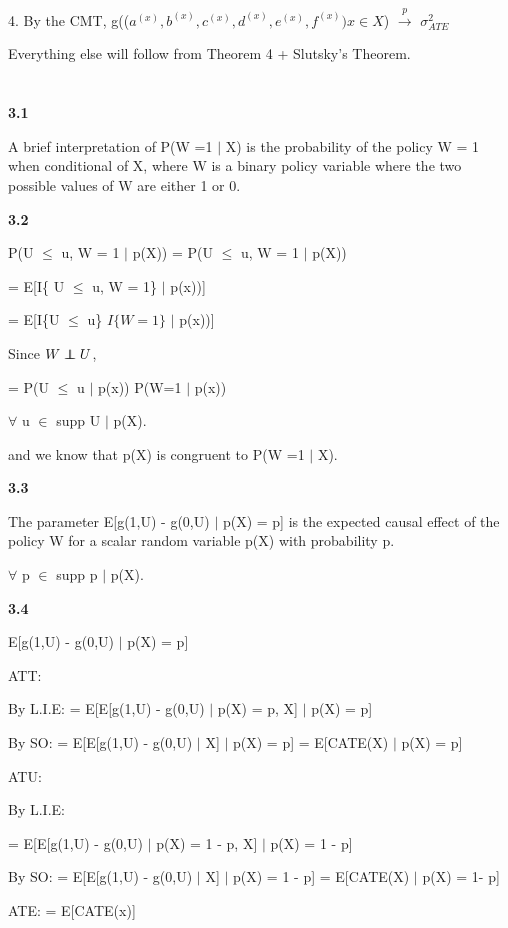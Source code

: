 \documentclass{article}
\newcommand\independent{\protect\mathpalette{\protect\independenT}{\perp}}
\def\independenT#1#2{\mathrel{\rlap{$#1#2$}\mkern2mu{#1#2}}}
\begin{document}
4. By the CMT, g(($a^{(x)},b^{(x)},c^{(x)},d^{(x)},e^{(x)},f^{(x)}) x \in X$) $\xrightarrow{p}$ $\sigma^{2}_{ATE}$

Everything else will follow from Theorem 4 + Slutsky's Theorem.

\section{}

\textbf{3.1}

A brief interpretation of P(W =1 $\mid$ X) is the probability of the policy W = 1 when conditional of X, where W is a binary policy variable where the two possible values of W are either 1 or 0.

\textbf{3.2}

P(U $\leq$ u, W = 1 $\mid$ p(X)) = P(U $\leq$ u, W = 1 $\mid$ p(X))

= E[I\{ U $\leq$ u, W = 1\} $\mid$ p(x))]

= E[I\{U $\leq$ u\} $I\{ W=1\}$ $\mid$ p(x))]

Since $W \independent U$,

=  P(U $\leq$ u $\mid$ p(x)) P(W=1 $\mid$ p(x))

$\forall$ u $\in$ supp U $\mid$ p(X).

and we know that p(X) is congruent to P(W =1 $\mid$ X).

\textbf{3.3}

The parameter E[g(1,U) - g(0,U) $\mid$ p(X) = p] is the expected causal effect of the policy W for a scalar random variable p(X) with probability p.

$\forall$ p $\in$ supp p $\mid$ p(X).

\textbf{3.4}

E[g(1,U) - g(0,U) $\mid$ p(X) = p]

ATT:

By L.I.E:
= E[E[g(1,U) - g(0,U) $\mid$ p(X) = p, X] $\mid$ p(X) = p]

By SO: = E[E[g(1,U) - g(0,U) $\mid$ X] $\mid$ p(X) = p] = E[CATE(X) $\mid$ p(X) = p]

ATU:

By L.I.E:

= E[E[g(1,U) - g(0,U) $\mid$ p(X) = 1 - p, X] $\mid$ p(X) = 1 - p]

By SO: = E[E[g(1,U) - g(0,U) $\mid$ X] $\mid$ p(X) = 1 - p] = E[CATE(X) $\mid$ p(X) = 1- p]

ATE: = E[CATE(x)]

\section{}
\end{document}
